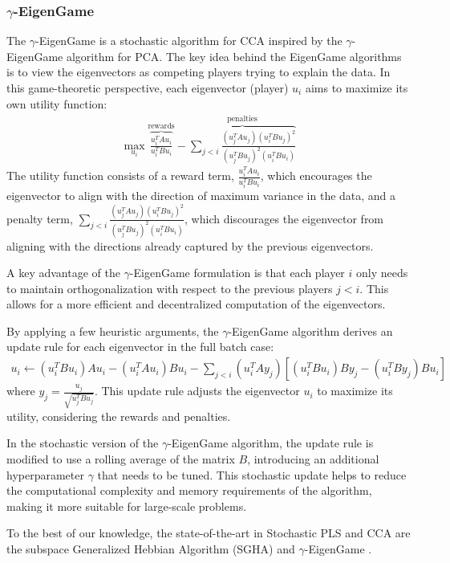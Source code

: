 \subsubsection{$\gamma$-EigenGame}
The $\gamma$-EigenGame is a stochastic algorithm for CCA inspired by the $\gamma$-EigenGame algorithm for PCA. The key idea behind the EigenGame algorithms is to view the eigenvectors as competing players trying to explain the data. In this game-theoretic perspective, each eigenvector (player) $u_i$ aims to maximize its own utility function:
\begin{align}
\max_{u_i} \overbrace{\frac{u_i^TAu_i}{u_i^TBu_i}}^{\text{rewards}} - \overbrace{\sum_{j < i} \frac{(u_j^TAu_j)(u_i^TBu_j)^2}{(u_j^TBu_j)^2(u_i^TBu_i)}}^{\text{penalties}}
\end{align}
The utility function consists of a reward term, $\frac{u_i^TAu_i}{u_i^TBu_i}$, which encourages the eigenvector to align with the direction of maximum variance in the data, and a penalty term, $\sum_{j < i} \frac{(u_j^TAu_j)(u_i^TBu_j)^2}{(u_j^TBu_j)^2(u_i^TBu_i)}$, which discourages the eigenvector from aligning with the directions already captured by the previous eigenvectors.

A key advantage of the $\gamma$-EigenGame formulation is that each player $i$ only needs to maintain orthogonalization with respect to the previous players $j < i$. This allows for a more efficient and decentralized computation of the eigenvectors.

By applying a few heuristic arguments, the $\gamma$-EigenGame algorithm derives an update rule for each eigenvector in the full batch case:
\begin{align}
u_i \leftarrow (u_i^T B u_i)A u_i - (u_i^T A u_i)B u_i - \sum_{j < i} (u_i^T A y_j)[(u_i^T B u_i)B y_j - (u_i^T B y_j)B u_i]
\end{align}
where $y_j = \frac{u_j}{\sqrt{u_j^TBu_j}}$. This update rule adjusts the eigenvector $u_i$ to maximize its utility, considering the rewards and penalties.

In the stochastic version of the $\gamma$-EigenGame algorithm, the update rule is modified to use a rolling average of the matrix $B$, introducing an additional hyperparameter $\gamma$ that needs to be tuned. This stochastic update helps to reduce the computational complexity and memory requirements of the algorithm, making it more suitable for large-scale problems.

To the best of our knowledge, the state-of-the-art in Stochastic PLS and CCA are the subspace Generalized Hebbian Algorithm (SGHA) \citep{chen2019constrained} and $\gamma$-EigenGame \citep{gemp20,gemp2021}.

